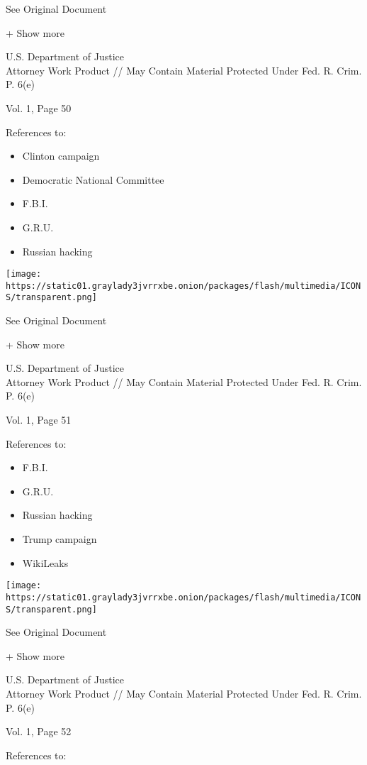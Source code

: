 See Original Document

+ Show more

U.S. Department of Justice\\
Attorney Work Product // May Contain Material Protected Under Fed. R.
Crim. P. 6(e)

Vol. 1, Page 50

References to:

\begin{itemize}
\tightlist
\item
  Clinton campaign
\item
  Democratic National Committee
\item
  F.B.I.
\item
  G.R.U.
\item
  Russian hacking
\end{itemize}

\protect\hyperlink{}{}

\texttt{[image: https://static01.graylady3jvrrxbe.onion/packages/flash/multimedia/ICONS/transparent.png]}

See Original Document

+ Show more

U.S. Department of Justice\\
Attorney Work Product // May Contain Material Protected Under Fed. R.
Crim. P. 6(e)

Vol. 1, Page 51

References to:

\begin{itemize}
\tightlist
\item
  F.B.I.
\item
  G.R.U.
\item
  Russian hacking
\item
  Trump campaign
\item
  WikiLeaks
\end{itemize}

\protect\hyperlink{}{}

\texttt{[image: https://static01.graylady3jvrrxbe.onion/packages/flash/multimedia/ICONS/transparent.png]}

See Original Document

+ Show more

U.S. Department of Justice\\
Attorney Work Product // May Contain Material Protected Under Fed. R.
Crim. P. 6(e)

Vol. 1, Page 52

References to:

